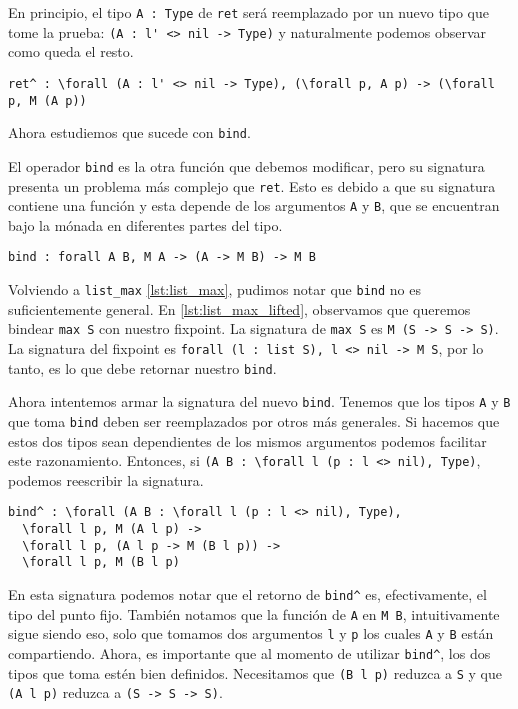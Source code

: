 En principio, el tipo \lstinline{A : Type} de \lstinline{ret} será reemplazado por un nuevo tipo que tome la prueba: \lstinline{(A : l' <> nil -> Type)} y naturalmente podemos observar como queda el resto. 

\begin{lstlisting}[float=h,frame=tb,caption={Signatura deseada de \lstinline{ret}},label=lst:ret_motiv]
ret^ : \forall (A : l' <> nil -> Type), (\forall p, A p) -> (\forall p, M (A p))
\end{lstlisting}

Ahora estudiemos que sucede con \lstinline{bind}.

El operador \lstinline{bind} es la otra función que debemos modificar, pero su signatura presenta un problema más complejo que \lstinline{ret}. Esto es debido a que su signatura contiene una función y esta depende de los argumentos \lstinline{A} y \lstinline{B}, que se encuentran bajo la mónada en diferentes partes del tipo.

\begin{lstlisting}[frame=tb,caption={Signatura de \lstinline{bind}},label=lst:bind]
bind : forall A B, M A -> (A -> M B) -> M B
\end{lstlisting}

Volviendo a \lstinline{list_max} \ref{lst:list_max}, pudimos notar que \lstinline{bind} no es suficientemente general.
En \ref{lst:list_max_lifted}, observamos que queremos bindear \lstinline{max S} con nuestro fixpoint. La signatura de \lstinline{max S} es \lstinline{M (S -> S -> S)}.
La signatura del fixpoint es \lstinline{forall (l : list S), l <> nil -> M S}, por lo tanto, es lo que debe retornar nuestro \lstinline{bind}.

Ahora intentemos armar la signatura del nuevo \lstinline{bind}. Tenemos que los tipos \lstinline{A} y \lstinline{B} que toma \lstinline{bind} deben ser reemplazados por otros más generales. Si hacemos que estos dos tipos sean dependientes de los mismos argumentos podemos facilitar este razonamiento.
Entonces, si \lstinline{(A B : \forall l (p : l <> nil), Type)}, podemos reescribir la signatura.

\begin{lstlisting}[frame=tb,caption={Signatura deseada de \lstinline{bind}}]
bind^ : \forall (A B : \forall l (p : l <> nil), Type),
  \forall l p, M (A l p) ->
  \forall l p, (A l p -> M (B l p)) ->
  \forall l p, M (B l p)
\end{lstlisting}

En esta signatura podemos notar que el retorno de \lstinline{bind^} es, efectivamente, el tipo del punto fijo. También notamos que la función de \lstinline{A} en \lstinline{M B}, intuitivamente sigue siendo eso, solo que tomamos dos argumentos \lstinline{l} y \lstinline{p} los cuales \lstinline{A} y \lstinline{B} están compartiendo.
Ahora, es importante que al momento de utilizar \lstinline{bind^}, los dos tipos que toma estén bien definidos. Necesitamos que \lstinline{(B l p)} reduzca a \lstinline{S} y que \lstinline{(A l p)} reduzca a \lstinline{(S -> S -> S)}.

